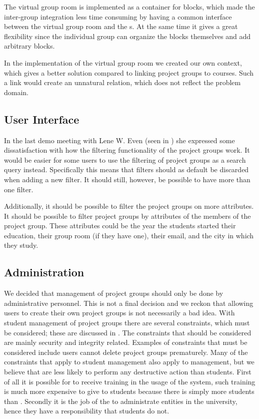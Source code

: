 The virtual group room is implemented as a container for blocks, which made the inter-group integration less time consuming by having a common interface between the virtual group room and the \detdeandrelaver{}s.
At the same time it gives a great flexibility since the individual group can organize the blocks themselves and add arbitrary blocks.

In the implementation of the virtual group room we created our own context, which gives a better solution compared to linking project groups to courses. 
Such a link would create an unnatural relation, which does not reflect the problem domain.  

\subsection{User Interface}
In the last demo meeting with Lene W. Even (seen in ) she expressed some dissatisfaction with how the filtering functionality of the project groups work.
It would be easier for some users to use the filtering of project groups as a search query instead.
Specifically this means that filters should as default be discarded when adding a new filter.
It should still, however, be possible to have more than one filter.

Additionally, it should be possible to filter the project groups on more attributes.
It should be possible to filter project groups by attributes of the members of the project group.
These attributes could be the year the students started their education, their group room (if they have one), their email, and the city in which they study.


\subsection{Administration}
\label{sec:evalAdministration}
We decided that management of project groups should only be done by administrative personnel. 
This is not a final decision and we reckon that allowing users to create their own project groups is not necessarily a bad idea. 
With student management of project groups there are several constraints, which must be considered; these are discussed in . 
The constraints that should be considered are mainly security and integrity related.
Examples of constraints that must be considered include users cannot delete project groups prematurely.
Many of the constraints that apply to student management also apply to \admpers{} management, but we believe that \admpers{} are less likely to perform any destructive action than students.
First of all it is possible for \admpers{} to receive training in the usage of the system, such training is much more expensive to give to students because there is simply more students than \admpers{}.
Secondly it is the job of the \admpers{} to administrate entities in the university, hence they have a responsibility that students do not.

